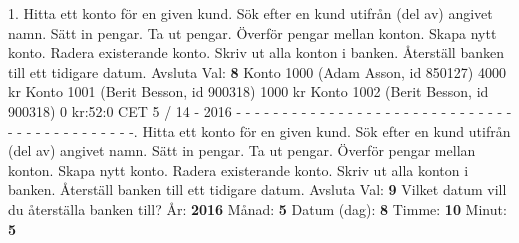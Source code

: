 1.   Hitta ett konto för en given kund.   Sök efter en kund utifrån (del av) angivet namn.   Sätt in pengar.   Ta ut pengar.   Överför pengar mellan konton.   Skapa nytt konto.   Radera existerande konto.   Skriv ut alla konton i banken.   Återställ banken till ett tidigare datum. Avsluta\newline
Val: \textbf{8}\newline
Konto 1000 (Adam Asson, id 850127) 4000 kr\newline
Konto 1001 (Berit Besson, id 900318) 1000 kr\newline
Konto 1002 (Berit Besson, id 900318) 0 kr:52:0 CET 5 / 14 - 2016\newline
\newline
- - - - - - - - - - - - - - - - - - - - - - - - - - - - - - - - - - - - - - - - - - - -.   Hitta ett konto för en given kund.   Sök efter en kund utifrån (del av) angivet namn.   Sätt in pengar.   Ta ut pengar.   Överför pengar mellan konton.   Skapa nytt konto.   Radera existerande konto.   Skriv ut alla konton i banken.   Återställ banken till ett tidigare datum. Avsluta\newline
Val: \textbf{9}\newline
Vilket datum vill du återställa banken till?
År: \textbf{2016}\newline
Månad: \textbf{5}\newline
Datum (dag): \textbf{8}\newline
Timme: \textbf{10}\newline
Minut: \textbf{5}\newline

